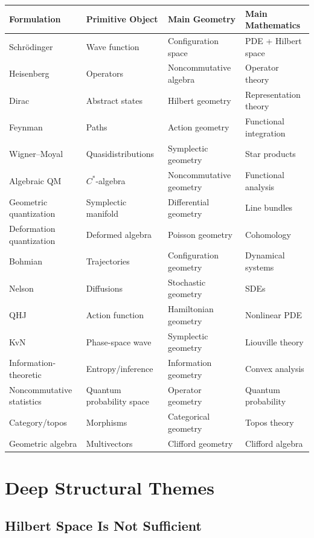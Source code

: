 \documentclass[11pt]{article}
\begin{document}
\begin{longtable}{p{3cm}p{3cm}p{4cm}p{4cm}}
\toprule
Formulation & Primitive Object & Main Geometry & Main Mathematics \\
\midrule
Schr\"odinger & Wave function & Configuration space & PDE + Hilbert space \\
Heisenberg & Operators & Noncommutative algebra & Operator theory \\
Dirac & Abstract states & Hilbert geometry & Representation theory \\
Feynman & Paths & Action geometry & Functional integration \\
Wigner--Moyal & Quasidistributions & Symplectic geometry & Star products \\
Algebraic QM & $C^*$-algebra & Noncommutative geometry & Functional analysis \\
Geometric quantization & Symplectic manifold & Differential geometry & Line bundles \\
Deformation quantization & Deformed algebra & Poisson geometry & Cohomology \\
Bohmian & Trajectories & Configuration geometry & Dynamical systems \\
Nelson & Diffusions & Stochastic geometry & SDEs \\
QHJ & Action function & Hamiltonian geometry & Nonlinear PDE \\
KvN & Phase-space wave & Symplectic geometry & Liouville theory \\
Information-theoretic & Entropy/inference & Information geometry & Convex analysis \\
Noncommutative statistics & Quantum probability space & Operator geometry & Quantum probability \\
Category/topos & Morphisms & Categorical geometry & Topos theory \\
Geometric algebra & Multivectors & Clifford geometry & Clifford algebra \\
\bottomrule
\end{longtable}

\section{Deep Structural Themes}

\subsection{Hilbert Space Is Not Sufficient}
\end{document}
